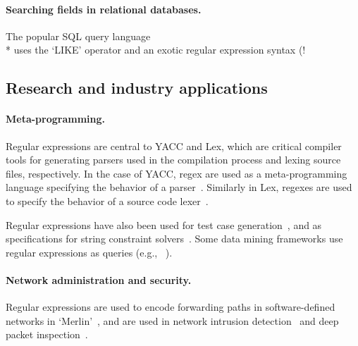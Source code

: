 \paragraph{Searching fields in relational databases.}  The popular SQL query language \\* uses the `LIKE' operator and an exotic regular expression syntax (\bverb!%


\subsection{Research and industry applications}
\paragraph{Meta-programming.}  Regular expressions are central to YACC and Lex, which are critical compiler tools for generating parsers used in the compilation process and lexing source files, respectively.  In the case of YACC, regex are used as a meta-programming language specifying the behavior of a parser~.  Similarly in Lex, regexes are used to specify the behavior of a source code lexer~.

Regular expressions have also been used for test case generation~,  and as specifications for string constraint solvers~.  Some data mining frameworks use regular expressions as queries (e.g., ~).

\paragraph{Network administration and security.} Regular expressions are used to encode forwarding paths in software-defined networks in `Merlin'~, and are used in network intrusion detection~ and deep packet inspection~.

